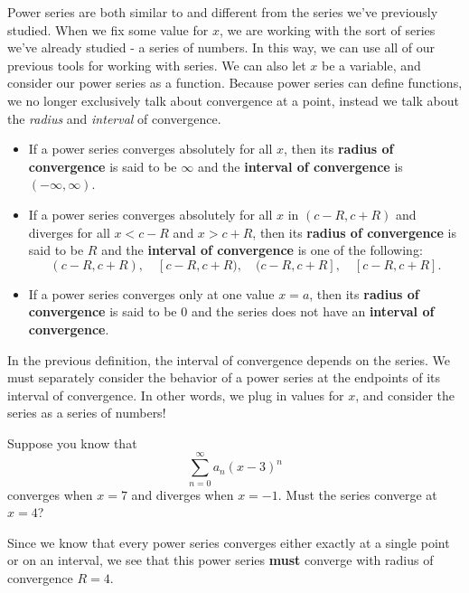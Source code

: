 \documentclass{ximera}
\begin{document}
Power series are both similar to and different from the series we've 
previously studied. When we fix some value for $x$, we are working 
with the sort of series we've already 
studied - a series of numbers.  In this way, we can use all of our previous 
tools for working with series.  We can also let $x$ be a variable, and consider 
our power series as a function.
 Because power series can define functions, we no longer exclusively
talk about convergence at a point, instead we talk about the
\textit{radius} and \textit{interval} of convergence.

\begin{definition}
  \hfil
  \begin{itemize}
    \item If a power series converges absolutely for all $x$, then its
      \textbf{radius of convergence} is said to be $\infty$ and the
      \textbf{interval of convergence} is $(-\infty,\infty)$.
    \item If a power series converges absolutely for all $x$ in
      $(c-R,c+R)$ and diverges for all $x<c-R$ and $x>c+R$, then its
      \textbf{radius of convergence} is said to be $R$ and the
      \textbf{interval of convergence} is one of the following:
      \[
      (c-R,c+R),\quad [c-R,c+R),\quad (c-R,c+R],\quad [c-R,c+R].
      \]
      \item If a power series converges only at one value $x=a$, then 
      its \textbf{radius of convergence} is said to be $0$ and the series does not have an 
      \textbf{interval of convergence}.
  \end{itemize}
\end{definition}

In the previous definition, the interval of convergence depends on the series.  We must 
separately consider the behavior of a power series at the endpoints of its interval 
of convergence.  In other words, we plug in values for $x$, and consider the series 
as a series of numbers!

\begin{question}
  Suppose you know that
  \[
  \sum_{n=0}^\infty a_n (x-3)^n
  \]
  converges when $x =7$ and diverges when $x = -1$. Must the series
  converge at $x=4$?
  \begin{prompt}
    \begin{multipleChoice}
    \end{multipleChoice}
  \end{prompt}
  \begin{feedback}
    Since we know that every power series converges either exactly at
    a single point or on an interval, we see that this power series
    \textbf{must} converge with radius of convergence $R=4$.
  \end{feedback}
\end{question}
\end{document}
